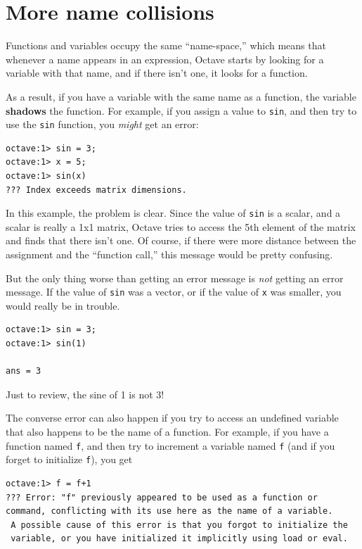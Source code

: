\documentclass{book}
\begin{document}
\section{More name collisions}

Functions and variables occupy the same ``name-space,'' which means
that whenever a name appears in an expression, Octave starts by looking
for a variable with that name, and if there isn't one, it looks for
a function.

As a result, if you have a variable with the same name as a function,
the variable {\bf shadows} the function. For example, if you assign
a value to {\tt sin}, and then try to use the {\tt sin} function, you
{\em might} get an error:

\begin{verbatim}
octave:1> sin = 3;
octave:1> x = 5;
octave:1> sin(x)
??? Index exceeds matrix dimensions.
\end{verbatim}

In this example, the problem is clear. Since the value of {\tt sin}
is a scalar, and a scalar is really a 1x1 matrix, Octave tries to
access the 5th element of the matrix and finds that there isn't one.
Of course, if there were more distance between the assignment
and the ``function call,'' this message would be pretty confusing.

But the only thing worse than getting an error message is {\em not}
getting an error message. If the value of {\tt sin} was a vector,
or if the value of {\tt x} was smaller, you would really
be in trouble.

\begin{verbatim}
octave:1> sin = 3;
octave:1> sin(1)

ans = 3
\end{verbatim}

Just to review, the sine of 1 is not 3!

The converse error can also happen if you try to access an
undefined variable that also happens to be the name of a function.
For example, if you have a function named {\tt f}, and then
try to increment a variable named {\tt f} (and if you forget to
initialize {\tt f}), you get

\begin{verbatim}
octave:1> f = f+1
??? Error: "f" previously appeared to be used as a function or 
command, conflicting with its use here as the name of a variable.
 A possible cause of this error is that you forgot to initialize the
 variable, or you have initialized it implicitly using load or eval.
\end{verbatim}
\end{document}

